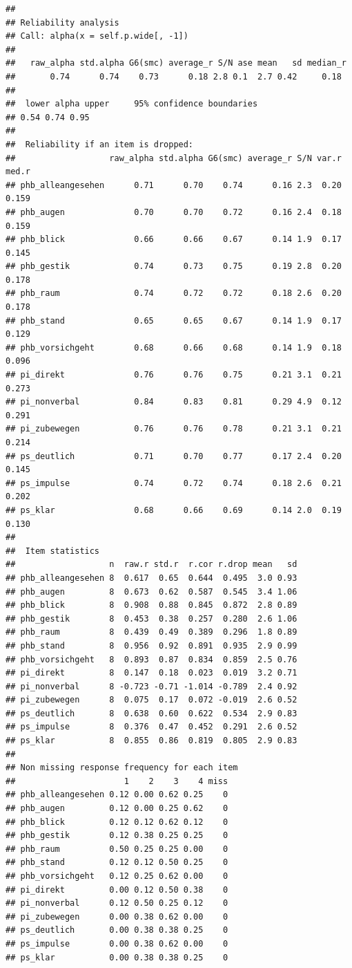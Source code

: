 \documentclass[
  english,
  man,floatsintext]{apa6}
\begin{document}
\begin{verbatim}
## 
## Reliability analysis   
## Call: alpha(x = self.p.wide[, -1])
## 
##   raw_alpha std.alpha G6(smc) average_r S/N ase mean   sd median_r
##       0.74      0.74    0.73      0.18 2.8 0.1  2.7 0.42     0.18
## 
##  lower alpha upper     95% confidence boundaries
## 0.54 0.74 0.95 
## 
##  Reliability if an item is dropped:
##                   raw_alpha std.alpha G6(smc) average_r S/N var.r med.r
## phb_alleangesehen      0.71      0.70    0.74      0.16 2.3  0.20 0.159
## phb_augen              0.70      0.70    0.72      0.16 2.4  0.18 0.159
## phb_blick              0.66      0.66    0.67      0.14 1.9  0.17 0.145
## phb_gestik             0.74      0.73    0.75      0.19 2.8  0.20 0.178
## phb_raum               0.74      0.72    0.72      0.18 2.6  0.20 0.178
## phb_stand              0.65      0.65    0.67      0.14 1.9  0.17 0.129
## phb_vorsichgeht        0.68      0.66    0.68      0.14 1.9  0.18 0.096
## pi_direkt              0.76      0.76    0.75      0.21 3.1  0.21 0.273
## pi_nonverbal           0.84      0.83    0.81      0.29 4.9  0.12 0.291
## pi_zubewegen           0.76      0.76    0.78      0.21 3.1  0.21 0.214
## ps_deutlich            0.71      0.70    0.77      0.17 2.4  0.20 0.145
## ps_impulse             0.74      0.72    0.74      0.18 2.6  0.21 0.202
## ps_klar                0.68      0.66    0.69      0.14 2.0  0.19 0.130
## 
##  Item statistics 
##                   n  raw.r std.r  r.cor r.drop mean   sd
## phb_alleangesehen 8  0.617  0.65  0.644  0.495  3.0 0.93
## phb_augen         8  0.673  0.62  0.587  0.545  3.4 1.06
## phb_blick         8  0.908  0.88  0.845  0.872  2.8 0.89
## phb_gestik        8  0.453  0.38  0.257  0.280  2.6 1.06
## phb_raum          8  0.439  0.49  0.389  0.296  1.8 0.89
## phb_stand         8  0.956  0.92  0.891  0.935  2.9 0.99
## phb_vorsichgeht   8  0.893  0.87  0.834  0.859  2.5 0.76
## pi_direkt         8  0.147  0.18  0.023  0.019  3.2 0.71
## pi_nonverbal      8 -0.723 -0.71 -1.014 -0.789  2.4 0.92
## pi_zubewegen      8  0.075  0.17  0.072 -0.019  2.6 0.52
## ps_deutlich       8  0.638  0.60  0.622  0.534  2.9 0.83
## ps_impulse        8  0.376  0.47  0.452  0.291  2.6 0.52
## ps_klar           8  0.855  0.86  0.819  0.805  2.9 0.83
## 
## Non missing response frequency for each item
##                      1    2    3    4 miss
## phb_alleangesehen 0.12 0.00 0.62 0.25    0
## phb_augen         0.12 0.00 0.25 0.62    0
## phb_blick         0.12 0.12 0.62 0.12    0
## phb_gestik        0.12 0.38 0.25 0.25    0
## phb_raum          0.50 0.25 0.25 0.00    0
## phb_stand         0.12 0.12 0.50 0.25    0
## phb_vorsichgeht   0.12 0.25 0.62 0.00    0
## pi_direkt         0.00 0.12 0.50 0.38    0
## pi_nonverbal      0.12 0.50 0.25 0.12    0
## pi_zubewegen      0.00 0.38 0.62 0.00    0
## ps_deutlich       0.00 0.38 0.38 0.25    0
## ps_impulse        0.00 0.38 0.62 0.00    0
## ps_klar           0.00 0.38 0.38 0.25    0
\end{verbatim}
\end{document}
